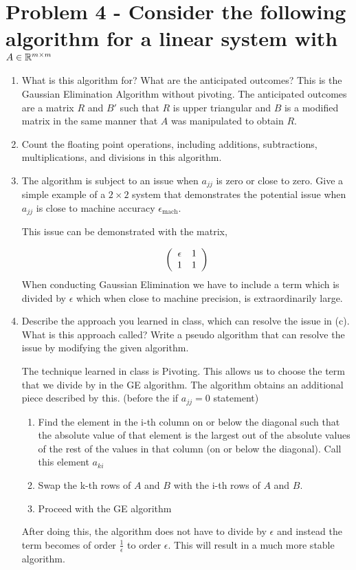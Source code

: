 \documentclass{article}
\begin{document}
\section{Problem 4 - Consider the following algorithm for a linear system with $A \in \mathbb{R}^{m\times m}$}

\begin{enumerate}
\item What is this algorithm for? What are the anticipated outcomes?
This is the Gaussian Elimination Algorithm without pivoting. The anticipated outcomes are a matrix $R$ and $B'$ such that $R$ is upper triangular and $B$ is a modified matrix in the same manner that $A$ was manipulated to obtain $R$.
 
\item Count the floating point operations, including additions, subtractions, multiplications,
and divisions in this algorithm.

\item  The algorithm is subject to an issue when $a_{jj}$ is zero or close to zero. Give a simple
example of a $2 \times 2$ system that demonstrates the potential issue when $a_{jj}$ is close to machine
accuracy $\epsilon_{\text{mach}}$.

This issue can be demonstrated with the matrix, 

\[
    \left(\begin{array}{c c} \epsilon & 1 \\ 1 & 1\end{array}\right)
\]
When conducting Gaussian Elimination we have to include a term which is divided by $\epsilon$ which when close to machine precision, is extraordinarily large. 

\item  Describe the approach you learned in class, which can resolve the issue in (c). What is
this approach called? Write a pseudo algorithm that can resolve the issue by modifying the
given algorithm.

The technique learned in class is Pivoting. This allows us to choose the term that we divide by in the GE algorithm. The algorithm obtains an additional piece described by this. 
(before the if $a_{jj} = 0$ statement)
\begin{enumerate}
\item  Find the element in the i-th column on or below the diagonal such that the absolute value of that element is the largest out of the absolute values of the rest of the values in that column (on or below the diagonal). Call this element $a_{ki}$

\item Swap the k-th rows of $A$ and $B$ with the i-th rows of $A$ and $B$. 

\item Proceed with the GE algorithm
\end{enumerate}
After doing this, the algorithm does not have to divide by $\epsilon$ and instead the term becomes of order $\frac{1}{\epsilon}$ to order $\epsilon$. This will result in a much more stable algorithm.

\end{enumerate}
\end{document}
